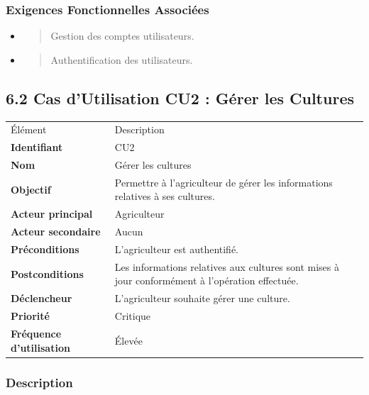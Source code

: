 \documentclass[
]{article}
\begin{document}
\hypertarget{exigences-fonctionnelles-associuxe9es}{%
\subsubsection{Exigences Fonctionnelles
Associées}\label{exigences-fonctionnelles-associuxe9es}}

\begin{itemize}
\item
  \begin{quote}
  Gestion des comptes utilisateurs.
  \end{quote}
\item
  \begin{quote}
  Authentification des utilisateurs.
  \end{quote}
\end{itemize}

\hypertarget{cas-dutilisation-cu2-guxe9rer-les-cultures}{%
\subsection{6.2 Cas d'Utilisation CU2 : Gérer les
Cultures}\label{cas-dutilisation-cu2-guxe9rer-les-cultures}}

\begin{longtable}[]{@{}ll@{}}
\toprule
\endhead
Élément & Description \\
\textbf{Identifiant} & CU2 \\
\textbf{Nom} & Gérer les cultures \\
\textbf{Objectif} & Permettre à l'agriculteur de gérer les informations
relatives à ses cultures. \\
\textbf{Acteur principal} & Agriculteur \\
\textbf{Acteur secondaire} & Aucun \\
\textbf{Préconditions} & L'agriculteur est authentifié. \\
\textbf{Postconditions} & Les informations relatives aux cultures sont
mises à jour conformément à l'opération effectuée. \\
\textbf{Déclencheur} & L'agriculteur souhaite gérer une culture. \\
\textbf{Priorité} & Critique \\
\textbf{Fréquence d'utilisation} & Élevée \\
\bottomrule
\end{longtable}

\hypertarget{description}{%
\subsubsection{Description}\label{description}}
\end{document}
